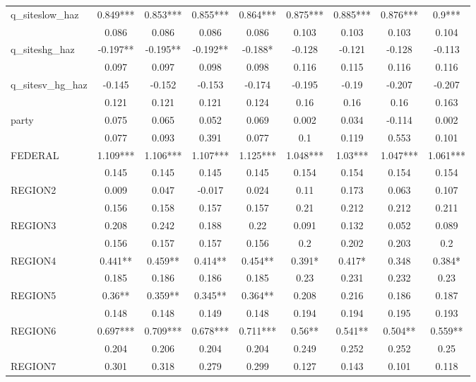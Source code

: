 \documentclass[12pt]{article}
\begin{document}
{\begin{table}[H]
{\begin{tabular}{l|cccc|cccc}
        q\_siteslow\_haz & 0.849*** & 0.853*** & 0.855*** & 0.864*** & 0.875*** & 0.885*** & 0.876*** & 0.9*** \\ 
        ~ & 0.086 & 0.086 & 0.086 & 0.086 & 0.103 & 0.103 & 0.103 & 0.104 \\ 
        q\_siteshg\_haz & -0.197** & -0.195** & -0.192** & -0.188* & -0.128 & -0.121 & -0.128 & -0.113 \\ 
        ~ & 0.097 & 0.097 & 0.098 & 0.098 & 0.116 & 0.115 & 0.116 & 0.116 \\ 
        q\_sitesv\_hg\_haz & -0.145 & -0.152 & -0.153 & -0.174 & -0.195 & -0.19 & -0.207 & -0.207 \\ 
        ~ & 0.121 & 0.121 & 0.121 & 0.124 & 0.16 & 0.16 & 0.16 & 0.163 \\ \hline
        party & 0.075 & 0.065 & 0.052 & 0.069 & 0.002 & 0.034 & -0.114 & 0.002 \\ 
        ~ & 0.077 & 0.093 & 0.391 & 0.077 & 0.1 & 0.119 & 0.553 & 0.101 \\ 
        FEDERAL & 1.109*** & 1.106*** & 1.107*** & 1.125*** & 1.048*** & 1.03*** & 1.047*** & 1.061*** \\ 
        ~ & 0.145 & 0.145 & 0.145 & 0.145 & 0.154 & 0.154 & 0.154 & 0.154 \\ 
        REGION2 & 0.009 & 0.047 & -0.017 & 0.024 & 0.11 & 0.173 & 0.063 & 0.107 \\ 
        ~ & 0.156 & 0.158 & 0.157 & 0.157 & 0.21 & 0.212 & 0.212 & 0.211 \\ 
        REGION3 & 0.208 & 0.242 & 0.188 & 0.22 & 0.091 & 0.132 & 0.052 & 0.089 \\ 
        ~ & 0.156 & 0.157 & 0.157 & 0.156 & 0.2 & 0.202 & 0.203 & 0.2 \\ 
        REGION4 & 0.441** & 0.459** & 0.414** & 0.454** & 0.391* & 0.417* & 0.348 & 0.384* \\ 
        ~ & 0.185 & 0.186 & 0.186 & 0.185 & 0.23 & 0.231 & 0.232 & 0.23 \\ 
        REGION5 & 0.36** & 0.359** & 0.345** & 0.364** & 0.208 & 0.216 & 0.186 & 0.187 \\ 
        ~ & 0.148 & 0.148 & 0.149 & 0.148 & 0.194 & 0.194 & 0.195 & 0.193 \\ 
        REGION6 & 0.697*** & 0.709*** & 0.678*** & 0.711*** & 0.56** & 0.541** & 0.504** & 0.559** \\ 
        ~ & 0.204 & 0.206 & 0.204 & 0.204 & 0.249 & 0.252 & 0.252 & 0.25 \\ 
        REGION7 & 0.301 & 0.318 & 0.279 & 0.299 & 0.127 & 0.143 & 0.101 & 0.118 \\ 

\end{tabular}}
\end{table}}
\end{document}
